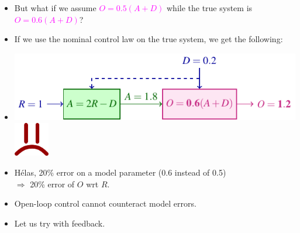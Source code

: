 \begin{frame}
\myPause
 \begin{itemize}[<+-| alert@+>]
 \item But what if we assume \textcolor{magenta}{$O=0.5(A+D)$} while the true system is
       \textcolor{magenta}{ $O=\mathbf{0.6}(A+D)$}?
 \item If we use the nominal control law  on the true system, we get the following:
 \item[] \begin{center}
          \includegraphics[width=0.65\columnwidth]{./Unit-02/img/Taxonomy-OpenLoop-Example-PartialKnowledge.pdf}
          \hspace{6mm}\includegraphics[height=1.5cm]{./Unit-02/img/frown.png}
         \end{center}
 \item \vfill H\'{e}las, 20\% error on a model parameter (0.6 instead of 0.5)\\
       $\Rightarrow$ 20\% error of $O$ wrt $R$.
 \item Open-loop control cannot counteract model errors.
 \item Let us try with feedback.
 \end{itemize}
\end{frame}

